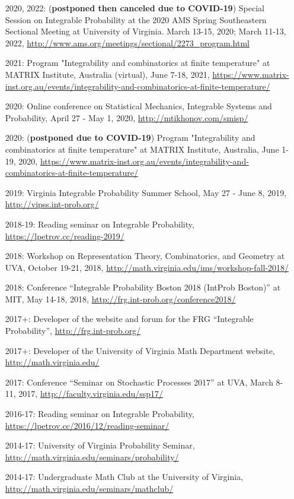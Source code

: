 \documentclass[letterpaper,11pt]{article}
\begin{document}
\begin{itemize}
	\item [2020, 2022:]
	(\textbf{postponed then canceled due to COVID-19})
		Special Session on Integrable Probability
		at the 2020 AMS Spring Southeastern Sectional Meeting at 
		University of Virginia.
		March 13-15, 2020; March 11-13, 2022,
		\url{http://www.ams.org/meetings/sectional/2273_program.html}
	
	\item [2021:]
		Program "Integrability and combinatorics at finite temperature"
		at MATRIX Institute, Australia
		(virtual),
		June 7-18, 2021,
		\url{https://www.matrix-inst.org.au/events/integrability-and-combinatorics-at-finite-temperature/}
	\item [2020:]
	Online conference on Statistical Mechanics, Integrable Systems and Probability,
	April 27 - May 1, 2020,
	\url{http://mtikhonov.com/smisp/}
	\item [2020:]
	(\textbf{postponed due to COVID-19})
	Program "Integrability and combinatorics at finite temperature"
	at MATRIX Institute,
	Australia,
	June 1-19, 2020,
	\url{https://www.matrix-inst.org.au/events/integrability-and-combinatorics-at-finite-temperature/}
	
	\item [2019:]
		Virginia Integrable Probability Summer School,
		May 27 - June 8, 2019,
		\url{http://vipss.int-prob.org/}

	\item[2018-19:]
		Reading seminar on Integrable Probability,
	      \url{https://lpetrov.cc/reading-2019/}
		

	\item [2018:]
		Workshop on Representation Theory, Combinatorics, and Geometry
		at UVA,
		October 19-21, 2018,
		\url{http://math.virginia.edu/ims/workshop-fall-2018/}

	\item [2018:]
		Conference 
		``Integrable Probability Boston 2018 (IntProb Boston)''
		at MIT,
		May 14-18, 2018,
		\url{http://frg.int-prob.org/conference2018/}

	\item [2017+:]
		Developer of the website and forum for the FRG ``Integrable Probability'',
		\url{http://frg.int-prob.org/}

	\item [2017+:]
		Developer of the University of Virginia Math Department website,
		\url{http://math.virginia.edu/}
	\item
	      [2017:] Conference
	      ``Seminar on Stochastic Processes 2017'' at UVA,
				March 8-11, 2017,
	      \url{http://faculty.virginia.edu/ssp17/}
	\item
	      [2016-17:]
				Reading seminar on Integrable Probability,
	      \url{https://lpetrov.cc/2016/12/reading-seminar/}
	\item
			[2014-17:] University of Virginia Probability Seminar,
	      \url{http://math.virginia.edu/seminars/probability/}
	\item
	      [2014-17:]
				Undergraduate Math Club at the University of Virginia,
	      \url{http://math.virginia.edu/seminars/mathclub/}
\end{itemize}
\end{document}
